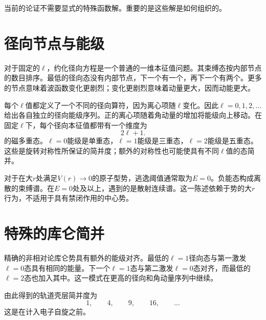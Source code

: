 当前的论证不需要显式的特殊函数解。重要的是这些解是如何组织的。

\section{径向节点与能级}

对于固定的\(\ell\)，约化径向方程是一个普通的一维本征值问题。其束缚态按内部节点的数目排序。最低的径向态没有内部节点，下一个有一个，再下一个有两个。更多的节点意味着波函数变化更剧烈；变化更剧烈意味着动量更大，因而动能更大。

每个\(\ell\)值都定义了一个不同的径向算符，因为离心项随\(\ell\)变化。因此\(\ell=0,1,2,\ldots\)给出各自独立的径向能级序列。正的离心项随着角动量的增加将能级向上移动。在固定\(\ell\)下，每个径向本征值都带有一个维度为
\begin{equation}
2\ell+1.
\end{equation}
的磁多重态。\(\ell=0\)能级是单重态，\(\ell=1\)能级是三重态，\(\ell=2\)能级是五重态。这些是旋转对称性所保证的简并度；额外的对称性也可能使具有不同\(\ell\)值的态简并。

对于在大\(r\)处满足\(V(r)\to0\)的原子型势，逃逸阈值通常取为\(E=0\)。负能态构成离散的束缚谱。在\(E=0\)处及以上，遇到的是散射连续谱。这一陈述依赖于势的大\(r\)行为，不适用于具有禁闭作用的中心势。

\section{特殊的库仑简并}

精确的非相对论库仑势具有额外的能级对齐。最低的\(\ell=1\)径向态与第一激发\(\ell=0\)态具有相同的能量。下一个\(\ell=1\)态与第二激发\(\ell=0\)态对齐，而最低的\(\ell=2\)态也加入其中。这一模式在更高的径向和角动量序列中继续。

\begin{classroomqa}
\end{classroomqa}

由此得到的轨道壳层简并度为
\begin{equation}
1,\qquad 4,\qquad 9,\qquad 16,\qquad \ldots
\end{equation}
这是在计入电子自旋之前。

\begin{classroomqa}
\end{classroomqa}

